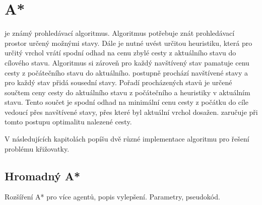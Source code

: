 \section{A*}\label{sec:a_star}


 je známý prohledávací algoritmus.
Algoritmus potřebuje znát prohledávací prostor určený možnými stavy.
Dále je nutné uvést určitou heuristiku, která pro určitý vrchol vrátí
spodní odhad na cenu zbylé cesty z aktuálního stavu do cílového stavu.
Algoritmus si zároveň pro každý navštívený stav pamatuje cenu cesty z počátečního stavu do aktuálního.
 postupně prochází navštívené stavy a pro každý stav přidá sousední stavy.
Pořadí procházených stavů je určené součtem ceny cesty do aktuálního stavu z počátečního a heuristiky v aktuálním stavu.
Tento součet je spodní odhad na minimální cenu cesty z počátku do cíle vedoucí přes navštívené stavy,
přes které byl aktuální vrchol dosažen.
 zaručuje při tomto postupu optimalitu nalezené cesty.

V následujících kapitolách popíšu dvě různé implementace  algoritmu pro řešení problému křižovatky.



\subsection{Hromadný A*}\label{subsec:hromadny_a_star}

Rozšíření A* pro více agentů, popis vylepšení.
Parametry, pseudokód.


